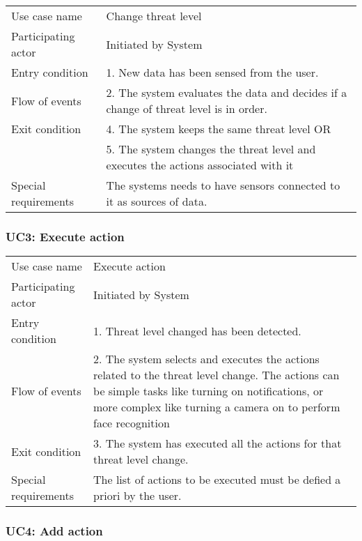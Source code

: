 \begin{tabular}{ l p{11cm} }
	\hline                       
	Use case name & Change threat level\\
	Participating actor & Initiated by System\\
	Entry condition & 1. New data has been sensed from the user. \\
	Flow of events & 2. The system evaluates the data and decides if a change of threat level is in order.\\
	Exit condition & 4. The system keeps the same threat level OR \\
	& 5. The system changes the threat level and executes the actions associated with it \\
	Special requirements & The systems needs to have sensors connected to it as sources of data. \\
	\hline
\end{tabular}


\subsubsection{UC3: Execute action}

\begin{tabular}{ l p{11cm} }
	\hline                       
	Use case name & Execute action\\
	Participating actor & Initiated by System\\
	Entry condition & 1. Threat level changed has been detected. \\
	Flow of events & 2. The system selects and executes the actions related to the threat level change. The actions can be simple tasks like turning on notifications, or more complex like turning a camera on to perform face recognition\\
	Exit condition & 3. The system has executed all the actions for that threat level change. \\
	Special requirements & The list of actions to be executed must be defied a priori by the user.\\
	\hline
\end{tabular}

\subsubsection{UC4: Add action}

